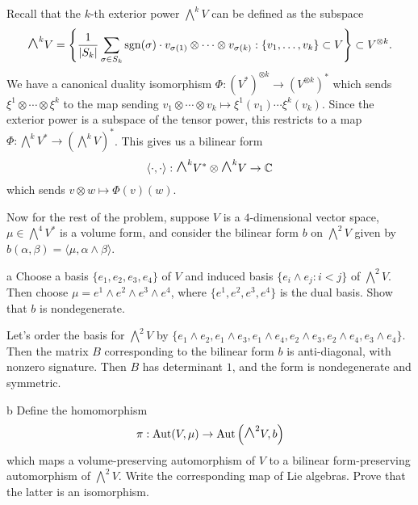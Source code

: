 \documentclass{pset}
\begin{document}
\begin{solution}
  Recall that the $k$-th exterior power $\bigwedge^k V$ can be defined as the subspace
  \[
    \bigwedge^k V = \left\{ \frac{1}{|S_k|}\sum_{\sigma\in S_k} \sgn(\sigma)\cdot v_{\sigma(1)}\otimes \cdots \otimes v_{\sigma(k)} : \{v_1,\ldots, v_k\} \subset V\right\} \subset V^{\otimes k}.
  \]
  We have a canonical duality isomorphism $\Phi : (V^*)^{\otimes k} \to \left(V^{\otimes k}\right)^*$ which sends $\xi^1\otimes \cdots \otimes \xi^k$ to the map sending $v_1\otimes \cdots \otimes v_k \mapsto \xi^1(v_1)\cdots\xi^k(v_k)$. Since the exterior power is a subspace of the tensor power, this restricts to a map $\Phi : \bigwedge^k V^* \to (\bigwedge^k V)^*$. This gives us a bilinear form
  \[
    \langle\cdot,\cdot\rangle :\bigwedge^k V^* \otimes \bigwedge^k V \to \C
  \]
  which sends $v\otimes w \mapsto \Phi(v)(w)$.

  Now for the rest of the problem, suppose $V$ is a $4$-dimensional vector space, $\mu\in \bigwedge^4 V^*$ is a volume form, and consider the bilinear form $b$ on $\bigwedge^2 V$ given by $b(\alpha,\beta) = \langle \mu, \alpha\wedge \beta\rangle$.

  \begin{part}{a}
    Choose a basis $\{e_1, e_2, e_3, e_4\}$ of $V$ and induced basis $\{e_i \wedge e_j : i < j\}$ of $\bigwedge^2 V$. Then choose $\mu = e^1\wedge e^2\wedge e^3\wedge e^4$, where $\{e^1,e^2,e^3,e^4\}$ is the dual basis. Show that $b$ is nondegenerate.
  \end{part}

  Let's order the basis for $\bigwedge^2 V$ by $\{e_1\wedge e_2, e_1\wedge e_3, e_1\wedge e_4, e_2\wedge e_3, e_2\wedge e_4, e_3\wedge e_4\}$. Then the matrix $B$ corresponding to the bilinear form $b$ is anti-diagonal, with nonzero signature. Then $B$ has determinant $1$, and the form is nondegenerate and symmetric. 

  \begin{part}{b}
    Define the homomorphism
    \[
      \pi : \Aut(V, \mu) \to \Aut\left(\bigwedge^2 V, b\right)
    \]
    which maps a volume-preserving automorphism of $V$ to a bilinear form-preserving automorphism of $\bigwedge^2 V$. Write the corresponding map of Lie algebras. Prove that the latter is an isomorphism.
  \end{part}


\end{solution}
\end{document}
